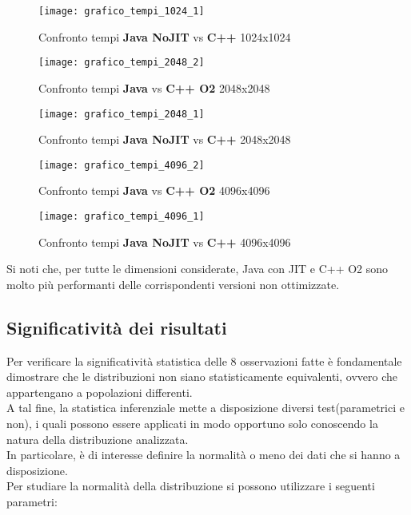 \begin{figure}[!htbp]
  \texttt{[image: grafico\_tempi\_1024\_1]}
  \caption{Confronto tempi \textbf{Java NoJIT} vs \textbf{C++} 1024x1024}
  \label{prodottomatrici_grafico_tempi_1024_1}
\end{figure}

\clearpage

\begin{figure}[!htbp]
  \texttt{[image: grafico\_tempi\_2048\_2]}
  \caption{Confronto tempi \textbf{Java} vs \textbf{C++ O2} 2048x2048}
  \label{prodottomatrici_grafico_tempi_2048_2}
\end{figure}

\begin{figure}[!htbp]
  \texttt{[image: grafico\_tempi\_2048\_1]}
  \caption{Confronto tempi \textbf{Java NoJIT} vs \textbf{C++} 2048x2048}
  \label{prodottomatrici_grafico_tempi_2048_1}
\end{figure}

\clearpage

\begin{figure}[!htbp]
  \texttt{[image: grafico\_tempi\_4096\_2]}
  \caption{Confronto tempi \textbf{Java} vs \textbf{C++ O2} 4096x4096}
  \label{prodottomatrici_grafico_tempi_4096_2}
\end{figure}

\begin{figure}[!htbp]
  \texttt{[image: grafico\_tempi\_4096\_1]}
  \caption{Confronto tempi \textbf{Java NoJIT} vs \textbf{C++} 4096x4096}
  \label{prodottomatrici_grafico_tempi_4096_1}
\end{figure}

Si noti che, per tutte le dimensioni considerate, Java con JIT e C++ O2 sono
molto più performanti delle corrispondenti versioni non ottimizzate.\\
\clearpage
\subsection{Significatività dei risultati}

Per verificare la significatività statistica delle 8 osservazioni fatte è fondamentale
dimostrare che le distribuzioni non siano statisticamente equivalenti, ovvero che
appartengano a popolazioni differenti.\\
A tal fine, la statistica inferenziale mette a disposizione diversi test(parametrici e non),
i quali possono essere applicati in modo opportuno solo conoscendo la natura
della distribuzione analizzata.\\
In particolare, è di interesse definire la normalità o meno dei dati che si hanno
a disposizione.\\
Per studiare la normalità della distribuzione si possono utilizzare i seguenti
parametri:

